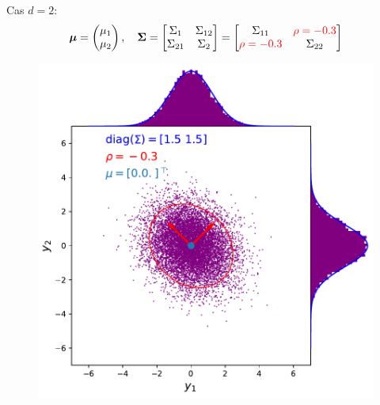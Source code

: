 \documentclass[xcolor=svgnames, t]{beamer}
\newcommand{\vectorx}[1]{\boldsymbol{\MakeLowercase{\mathbf{#1}}}}
\newcommand{\matrixx}[1]{\boldsymbol{\MakeUppercase{#1}}}
\begin{document}
\begin{frame}
  Cas $d=2$:
  \begin{equation*}
    \vectorx{\mu}
    =
    \begin{pmatrix}
      \mu_1 \\
      \mu_2
    \end{pmatrix},
    \quad
    \matrixx{\Sigma}
    =
      \begin{bmatrix}
        \Sigma_{1} & \Sigma_{12} \\
        \Sigma_{21} & \Sigma_{2}
      \end{bmatrix}
    =
      \begin{bmatrix}
        \Sigma_{11} & \color{red}\rho = -0.3 \\
        \color{red}\rho = -0.3 & \Sigma_{22}
      \end{bmatrix}
  \end{equation*}
% 
  \begin{figure}
    \includegraphics[scale=0.4]{gaussian_2d_rho_low.pdf}
  \end{figure}
\end{frame}
\end{document}
